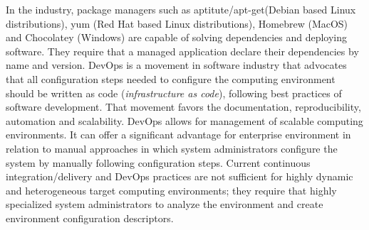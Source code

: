 In the industry, package managers such as aptitute/apt-get(Debian based Linux distributions)\cite{aoki_debian_2016}, yum (Red Hat based Linux distributions)\cite{svistunov_red_2016}, Homebrew (MacOS)\cite{homebrew_homebrew_2016} and Chocolatey (Windows)\cite{chocolatey_chocolatey_2016} are capable of solving dependencies and deploying software. They require that a managed application declare their dependencies by name and version. DevOps\cite{bang_grounded_2013} is a movement in software industry that advocates that all configuration steps needed to configure the computing environment should be written as code (\emph{infrastructure as code}), following best practices of software development. That movement favors the documentation, reproducibility, automation and scalability.
DevOps allows for management of scalable computing environments. It can offer a significant advantage for enterprise environment in relation to manual approaches in which system administrators configure the system by manually following configuration steps. Current continuous integration/delivery and DevOps practices are not sufficient for highly dynamic and heterogeneous target computing environments; they require that highly specialized system administrators to analyze the environment and create environment configuration descriptors.
